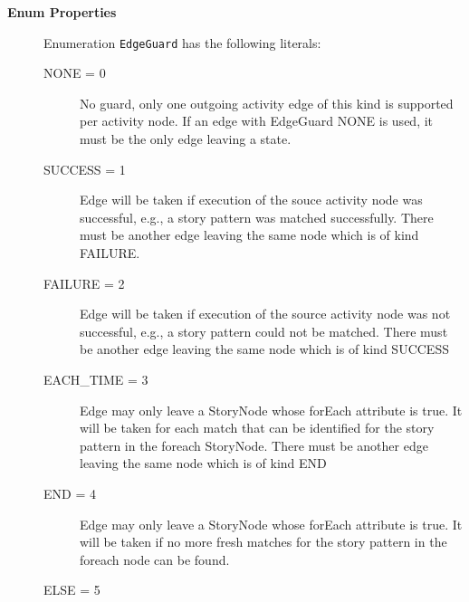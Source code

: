 \begin{description}

	\item[\textbf{Enum Properties}] Enumeration \texttt{EdgeGuard} has the following literals:

	\begin{description}
		
		\item[NONE = 0]
		\hspace{\fill}
		\nopagebreak
		
No guard, only one outgoing activity edge of this kind is supported per activity node. If an edge with EdgeGuard NONE is used, it must be the only edge leaving a state.	

		\item[SUCCESS = 1]
		\hspace{\fill}
		\nopagebreak
		
Edge will be taken if execution of the souce activity node was successful, e.g., a story pattern was matched successfully. There must be another edge leaving the same node which is of kind FAILURE.	

		\item[FAILURE = 2]
		\hspace{\fill}
		\nopagebreak
		
Edge will be taken if execution of the source activity node was not successful, e.g., a story pattern could not be matched. There must be another edge leaving the same node which is of kind SUCCESS	

		\item[EACH\_TIME = 3]
		\hspace{\fill}
		\nopagebreak
		
Edge may only leave a StoryNode whose forEach attribute is true. It will be taken for each match that can be identified for the story pattern in the foreach StoryNode. There must be another edge leaving the same node which is of kind END	

		\item[END = 4]
		\hspace{\fill}
		\nopagebreak
		
Edge may only leave a StoryNode whose forEach attribute is true. It will be taken if no more fresh matches for the story pattern in the foreach node can be found.	

		\item[ELSE = 5]
		\hspace{\fill}
		\nopagebreak
		

\end{description}
\end{description}
